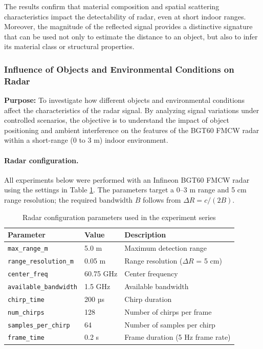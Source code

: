 The results confirm that material composition and spatial scattering characteristics impact the detectability of radar, even at short indoor ranges. Moreover, the magnitude of the reflected signal provides a distinctive signature that can be used not only to estimate the distance to an object, but also to infer its material class or structural properties.


\subsubsection{Influence of Objects and Environmental Conditions on Radar}
\noindent
\textbf{Purpose:}
To investigate how different objects and environmental conditions affect the characteristics of the radar signal. By analyzing signal variations under controlled scenarios, the objective is to understand the impact of object positioning and ambient interference on the features of the BGT60 FMCW radar within a short-range (0 to 3 m) indoor environment.

\paragraph{Radar configuration.}
All experiments below were performed with an Infineon BGT60 FMCW radar using the settings in Table \ref{tab:radar_config}.  
The parameters target a 0–3 m range and 5 cm range resolution; the required bandwidth $B$ follows from $\Delta R = c/(2B)$.

\begin{table}[H]
\centering
\caption{Radar configuration parameters used in the experiment series}
\label{tab:radar_config}
\begin{tabular}{|l|l|l|}
\hline
\textbf{Parameter}           & \textbf{Value} & \textbf{Description} \\
\hline
\texttt{max\_range\_m}       & 5.0 m          & Maximum detection range \\
\texttt{range\_resolution\_m} & 0.05 m         & Range resolution ($\Delta R$ = 5 cm) \\
\texttt{center\_freq}        & 60.75 GHz      & Center frequency \\
\texttt{available\_bandwidth} & 1.5 GHz        & Available bandwidth \\
\texttt{chirp\_time}         & 200 µs         & Chirp duration \\
\texttt{num\_chirps}         & 128            & Number of chirps per frame \\
\texttt{samples\_per\_chirp} & 64             & Number of samples per chirp \\
\texttt{frame\_time}         & 0.2 s          & Frame duration (5 Hz frame rate) \\
\hline
\end{tabular}
\end{table}


